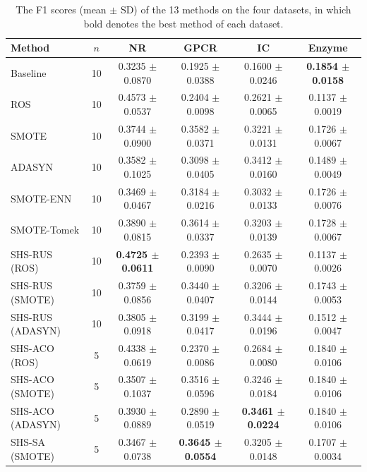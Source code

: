 \documentclass[pdflatex,sn-basic]{sn-jnl}
\begin{document}
\begin{table}[htbp]
\centering
\caption{The F1 scores (mean $\pm$ SD) of the 13 methods on the four
datasets, in which bold denotes the best method of each dataset.}
\label{tab:main}
\setlength{\tabcolsep}{3pt}%
\footnotesize
\begin{tabular}{lccccc}
\toprule
Method & $n$ & NR & GPCR & IC & Enzyme \\
\midrule
Baseline & 10 & 0.3235 $\pm$ 0.0870 & 0.1925 $\pm$ 0.0388 & 0.1600 $\pm$ 0.0246 & \textbf{0.1854 $\pm$ 0.0158} \\
ROS & 10 & 0.4573 $\pm$ 0.0537 & 0.2404 $\pm$ 0.0098 & 0.2621 $\pm$ 0.0065 & 0.1137 $\pm$ 0.0019 \\
SMOTE & 10 & 0.3744 $\pm$ 0.0900 & 0.3582 $\pm$ 0.0371 & 0.3221 $\pm$ 0.0131 & 0.1726 $\pm$ 0.0067 \\
ADASYN & 10 & 0.3582 $\pm$ 0.1025 & 0.3098 $\pm$ 0.0405 & 0.3412 $\pm$ 0.0160 & 0.1489 $\pm$ 0.0049 \\
SMOTE-ENN & 10 & 0.3469 $\pm$ 0.0467 & 0.3184 $\pm$ 0.0216 & 0.3032 $\pm$ 0.0133 & 0.1726 $\pm$ 0.0076 \\
SMOTE-Tomek & 10 & 0.3890 $\pm$ 0.0815 & 0.3614 $\pm$ 0.0337 & 0.3203 $\pm$ 0.0139 & 0.1728 $\pm$ 0.0067 \\
SHS-RUS (ROS) & 10 & \textbf{0.4725 $\pm$ 0.0611} & 0.2393 $\pm$ 0.0090 & 0.2635 $\pm$ 0.0070 & 0.1137 $\pm$ 0.0026 \\
SHS-RUS (SMOTE) & 10 & 0.3759 $\pm$ 0.0856 & 0.3440 $\pm$ 0.0407 & 0.3206 $\pm$ 0.0144 & 0.1743 $\pm$ 0.0053 \\
SHS-RUS (ADASYN) & 10 & 0.3805 $\pm$ 0.0918 & 0.3199 $\pm$ 0.0417 & 0.3444 $\pm$ 0.0196 & 0.1512 $\pm$ 0.0047 \\
SHS-ACO (ROS) & 5 & 0.4338 $\pm$ 0.0619 & 0.2370 $\pm$ 0.0086 & 0.2684 $\pm$ 0.0080 & 0.1840 $\pm$ 0.0106 \\
SHS-ACO (SMOTE) & 5 & 0.3507 $\pm$ 0.1037 & 0.3516 $\pm$ 0.0596 & 0.3246 $\pm$ 0.0184 & 0.1840 $\pm$ 0.0106 \\
SHS-ACO (ADASYN) & 5 & 0.3930 $\pm$ 0.0889 & 0.2890 $\pm$ 0.0519 & \textbf{0.3461 $\pm$ 0.0224} & 0.1840 $\pm$ 0.0106 \\
SHS-SA (SMOTE) & 5 & 0.3467 $\pm$ 0.0738 & \textbf{0.3645 $\pm$ 0.0554} & 0.3205 $\pm$ 0.0148 & 0.1707 $\pm$ 0.0034 \\
\bottomrule
\end{tabular}
\end{table}
\end{document}
